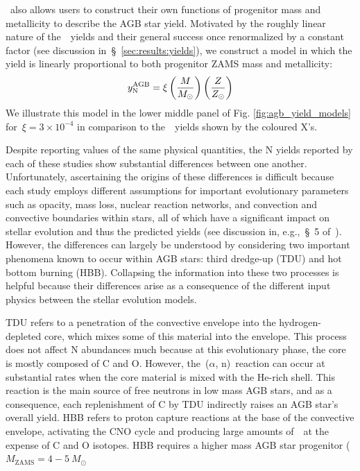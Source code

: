 \documentclass[ms.tex]{subfiles}
\begin{document}
\vice~also allows users to construct their own functions of progenitor mass
and metallicity to describe the AGB star yield.
Motivated by the roughly linear nature of the~\cristallo~yields and their
general success once renormalized by a constant factor (see discussion
in~\S~\ref{sec:results:yields}), we construct a model in which the yield is
linearly proportional to both progenitor ZAMS mass and metallicity:
\begin{equation}
y_\text{N}^\text{AGB} = \xi \left(\frac{M}{M_\odot}\right) \left(\frac{Z}{Z_\odot}\right)
\end{equation}
We illustrate this model in the lower middle panel of Fig.
\ref{fig:agb_yield_models} for~$\xi = 3\times10^{-4}$ in comparison to
the~\cristallo~yields shown by the coloured X's.
\par
Despite reporting values of the same physical quantities, the N yields
reported by each of these studies show substantial differences between one
another.
Unfortunately, ascertaining the origins of these differences is difficult
because each study employs different assumptions for important evolutionary
parameters such as opacity, mass loss, nuclear reaction networks, and
convection and convective boundaries within stars, all of which have a
significant impact on stellar evolution and thus the predicted yields (see
discussion in, e.g.,~\S~5 of~\citealp{Karakas2016}).
However, the differences can largely be understood by considering two important
phenomena known to occur within AGB stars: third dredge-up (TDU) and hot bottom
burning (HBB).
Collapsing the information into these two processes is helpful because their
differences arise as a consequence of the different input physics between the
stellar evolution models.
\par
TDU refers to a penetration of the convective envelope into the
hydrogen-depleted core, which mixes some of this material into the envelope.
This process does not affect N abundances much because at this evolutionary
phase, the core is mostly composed of C and O.
However, the~\Cthirteen($\alpha$, n)\Osixteen~reaction can occur at substantial
rates when the core material is mixed with the He-rich shell.
This reaction is the main source of free neutrons in low mass AGB stars, and as
a consequence, each replenishment of C by TDU indirectly raises an AGB star's
overall yield.
HBB refers to proton capture reactions at the base of the convective envelope,
activating the CNO cycle and producing large amounts of~\Nfourteen~at the
expense of C and O isotopes.
HBB requires a higher mass AGB star progenitor ($M_\text{ZAMS} = 4 - 5~M_\odot$
\end{document}
